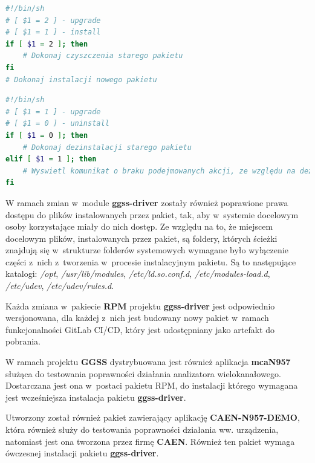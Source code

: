 \begin{lstlisting}[language=bash, caption={Przykład wykorzystania właściwości argumentów dla skryptu \textit{post-install}}, label={lst:rpmUpgrade}]
#!/bin/sh
# [ $1 = 2 ] - upgrade
# [ $1 = 1 ] - install
if [ $1 = 2 ]; then
    # Dokonaj czyszczenia starego pakietu
fi
# Dokonaj instalacji nowego pakietu
\end{lstlisting}

\begin{lstlisting}[language=bash, caption={Przykład wykorzystania właściwości argumentów dla skryptu \textit{pre-uninstall}}, label={lst:rpmUpgradePt2}]
#!/bin/sh
# [ $1 = 1 ] - upgrade
# [ $1 = 0 ] - uninstall
if [ $1 = 0 ]; then
    # Dokonaj dezinstalacji starego pakietu
elif [ $1 = 1 ]; then
    # Wyswietl komunikat o braku podejmowanych akcji, ze względu na dezinstalację wykonaną przez skrypt post-install
fi

\end{lstlisting}

W ramach zmian w~module \textbf{ggss-driver} zostały również poprawione prawa dostępu do plików instalowanych przez pakiet, tak, aby w~systemie docelowym osoby korzystające miały do nich dostęp. 
Ze względu na to, że miejscem docelowym plików, instalowanych przez pakiet, są foldery, których ścieżki znajdują się w~strukturze folderów systemowych wymagane było wyłączenie części z~nich z~tworzenia w~procesie instalacyjnym pakietu. Są to następujące katalogi: \textit{/opt}, \textit{/usr/lib/modules}, \textit{/etc/ld.so.conf.d}, \textit{/etc/modules-load.d}, \textit{/etc/udev}, \textit{/etc/udev/rules.d}.

Każda zmiana w~pakiecie \textbf{RPM} projektu \textbf{ggss-driver} jest odpowiednio wersjonowana, dla każdej z~nich jest budowany nowy pakiet w~ramach funkcjonalności GitLab CI/CD, który jest udostępniany jako artefakt do pobrania.

W ramach projektu \textbf{GGSS} dystrybuowana jest również aplikacja \textbf{mcaN957} służąca do testowania poprawności działania analizatora wielokanałowego. Dostarczana jest ona w~postaci pakietu RPM, do instalacji którego wymagana jest wcześniejsza instalacja pakietu \textbf{ggss-driver}.

Utworzony został również pakiet zawierający aplikację \textbf{CAEN-N957-DEMO}, która również służy do testowania poprawności działania ww. urządzenia, natomiast jest ona tworzona przez firmę \textbf{CAEN}. Również ten pakiet wymaga ówczesnej instalacji pakietu \textbf{ggss-driver}.



